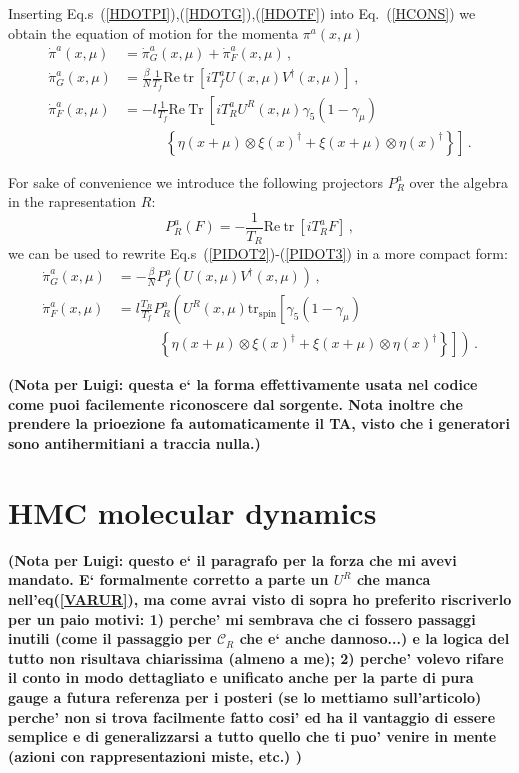 \documentclass{article}[12pt]
\begin{document}
Inserting Eq.s~(\ref{HDOTPI}),(\ref{HDOTG}),(\ref{HDOTF}) into Eq.~(\ref{HCONS}) we obtain the equation of motion
for the momenta $\pi^a(x,\mu)$
\begin{align}
\dot\pi^a(x,\mu) &= \dot\pi^a_G(x,\mu) + \dot\pi^a_F(x,\mu) \, , \label{PIDOT1}\\
\dot\pi^a_G(x,\mu) &= \frac{\beta}{N} \frac{1}{T_f} \mathrm{Re\ tr\ } \left[ i T^a_f U(x,\mu) V^\dagger(x,\mu) \right] \, ,\label{PIDOT2}\\
\dot\pi^a_F(x,\mu) &=- l \frac{1}{T_f} \mathrm{Re\ Tr\ } \left[ iT^a_R U^R(x,\mu) \gamma_5 (1-\gamma_\mu) \right. \nonumber\\
										&\quad\quad\quad	\left. \left\{ \eta(x+\mu)\otimes\xi(x)^\dagger + \xi(x+\mu)\otimes\eta(x)^\dagger \right\} \right]\, . \label{PIDOT3}
\end{align}

For sake of convenience we introduce the following projectors $P^a_R$ over the algebra in the rapresentation $R$:
\begin{equation}
P^a_R ( F ) = - \frac{1}{T_R} \mathrm{Re\ tr\ } \left[ i T^a_R F \right] \, ,
\end{equation}
we can be used to rewrite Eq.s~(\ref{PIDOT2})-(\ref{PIDOT3}) in a more compact form:
\begin{align}
\dot\pi^a_G(x,\mu) &= - \frac{\beta}{N} P^a_f \left( U(x,\mu) V^\dagger(x,\mu) \right) \, ,\\
\dot\pi^a_F(x,\mu) &= l \frac{T_R}{T_f} P^a_R \left( U^R(x,\mu) \mathrm{tr_{spin}} \left[ \gamma_5 (1-\gamma_\mu) \right. \right. \nonumber\\
										&\quad\quad\quad	\left. \left. \left\{ \eta(x+\mu)\otimes\xi(x)^\dagger + \xi(x+\mu)\otimes\eta(x)^\dagger \right\} \right] \right)\, . 
\end{align}

\noindent\textbf{(Nota per Luigi: questa e` la forma effettivamente usata nel codice come puoi facilemente riconoscere dal sorgente. Nota inoltre che prendere la prioezione fa automaticamente il TA, visto che i generatori sono antihermitiani a traccia nulla.)}



\section{HMC molecular dynamics}

\noindent\textbf{(Nota per Luigi: questo e` il paragrafo per la forza che mi avevi mandato. E` formalmente corretto
		a parte un $U^R$ che manca nell'eq(\ref{VARUR}), ma come avrai visto di sopra ho preferito riscriverlo per un paio
		motivi: 1) perche' mi sembrava che ci fossero passaggi inutili (come il passaggio per $\mathcal{C}_R$ che e` anche dannoso...) 
	 e la logica del tutto non risultava chiarissima (almeno a me); 2) perche' volevo rifare il conto in modo dettagliato e unificato anche per 
	 la parte di pura gauge a futura referenza per i posteri (se lo mettiamo sull'articolo) perche' non si trova facilmente fatto cosi' ed ha il vantaggio di essere semplice
	 e di generalizzarsi a tutto quello che ti puo' venire in mente (azioni con rappresentazioni miste, etc.) )}
\end{document}
